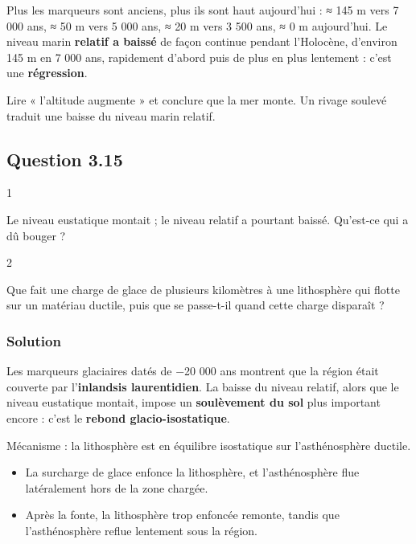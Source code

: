 \documentclass[11pt,a4paper]{article}
\providecommand{\tightlist}{\setlength{\itemsep}{0pt}\setlength{\parskip}{0pt}}
\begin{document}
Plus les marqueurs sont anciens, plus ils sont haut aujourd'hui : ≈ 145 m vers 7 000 ans, ≈ 50 m vers 5 000 ans, ≈ 20 m vers 3 500 ans, ≈ 0 m aujourd'hui. Le niveau marin \textbf{relatif a baissé} de façon continue pendant l'Holocène, d'environ 145 m en 7 000 ans, rapidement d'abord puis de plus en plus lentement : c'est une \textbf{régression}.

\begin{piege}

Lire « l'altitude augmente » et conclure que la mer monte. Un rivage soulevé traduit une baisse du niveau marin relatif.

\end{piege}

\hypertarget{question-3.15}{%
\subsection{Question 3.15}\label{question-3.15}}

\begin{indication}{1}

Le niveau eustatique montait ; le niveau relatif a pourtant baissé. Qu'est-ce qui a dû bouger ?

\end{indication}

\begin{indication}{2}

Que fait une charge de glace de plusieurs kilomètres à une lithosphère qui flotte sur un matériau ductile, puis que se passe-t-il quand cette charge disparaît ?

\end{indication}

\hypertarget{solution-42}{%
\subsubsection{Solution}\label{solution-42}}

Les marqueurs glaciaires datés de −20 000 ans montrent que la région était couverte par l'\textbf{inlandsis laurentidien}. La baisse du niveau relatif, alors que le niveau eustatique montait, impose un \textbf{soulèvement du sol} plus important encore : c'est le \textbf{rebond glacio-isostatique}.

Mécanisme : la lithosphère est en équilibre isostatique sur l'asthénosphère ductile.

\begin{itemize}
\tightlist
\item
  La surcharge de glace enfonce la lithosphère, et l'asthénosphère flue latéralement hors de la zone chargée.
\item
  Après la fonte, la lithosphère trop enfoncée remonte, tandis que l'asthénosphère reflue lentement sous la région.
\end{itemize}
\end{document}
